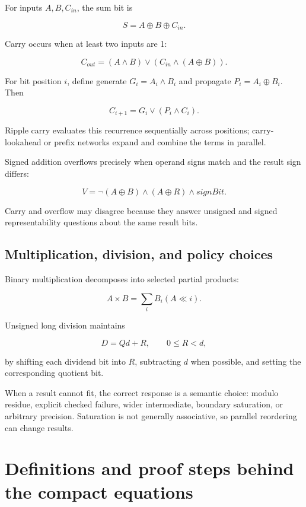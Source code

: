 \hypertarget{01-foundations-i-ch011-full-adder-carry-and-signed-overflow}{}

For inputs \(A,B,C_{in}\), the sum bit is

\[
S=A\oplus B\oplus C_{in}.
\]

Carry occurs when at least two inputs are 1:

\[
C_{out}=(A\land B)\lor(C_{in}\land(A\oplus B)).
\]

For bit position \(i\), define generate \(G_i=A_i\land B_i\) and propagate \(P_i=A_i\oplus B_i\). Then

\[
C_{i+1}=G_i\lor(P_i\land C_i).
\]

Ripple carry evaluates this recurrence sequentially across positions; carry-lookahead or prefix networks expand and combine the terms in parallel.

Signed addition overflows precisely when operand signs match and the result sign differs:

\[
V=\neg(A\oplus B)\land(A\oplus R)\land signBit.
\]

Carry and overflow may disagree because they answer unsigned and signed representability questions about the same result bits.

\subsection{Multiplication, division, and policy choices}\label{01-foundations-i-ch011-multiplication-division-and-policy-choices}

\hypertarget{01-foundations-i-ch011-multiplication-division-and-policy-choices}{}

Binary multiplication decomposes into selected partial products:

\[
A\times B=\sum_i B_i(A\ll i).
\]

Unsigned long division maintains

\[
D=Qd+R,\qquad 0\le R<d,
\]

by shifting each dividend bit into \(R\), subtracting \(d\) when possible, and setting the corresponding quotient bit.

When a result cannot fit, the correct response is a semantic choice: modulo residue, explicit checked failure, wider intermediate, boundary saturation, or arbitrary precision. Saturation is not generally associative, so parallel reordering can change results.

\section{Definitions and proof steps behind the compact equations}\label{01-foundations-i-ch011-definitions-and-proof-steps-behind-the-compact-equations}

